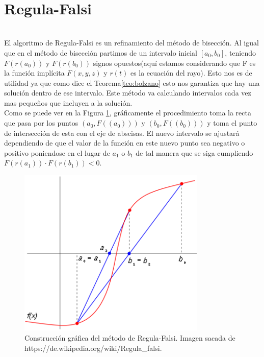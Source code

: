 ${ }$\\
\section{Regula-Falsi}
${ }$\\

El algoritmo de Regula-Falsi es un refinamiento del método de bisección. Al igual que en el método de bisección partimos de un intervalo inicial $[a_0, b_0]$, teniendo $F(r(a_0))$ y $F(r(b_0))$ signos opuestos(aquí estamos considerando que F es la función implícita $F(x,y,z)$ y $r(t)$ es la ecuación del rayo). Esto nos es de utilidad ya que como dice el Teorema\ref{teo:bolzano} esto nos garantiza que hay una solución dentro de ese intervalo. Este método va calculando intervalos cada vez mas pequeños que incluyen a la solución.
${ }$\\

Como se puede ver en la Figura \ref{fig:etiq_8}, gráficamente el procedimiento toma la recta que pasa por los puntos $(a_0, F((a_0)))$ y $(b_0, F((b_0)))$ y toma el punto de intersección de esta con el eje de abscisas. El nuevo intervalo se ajustará dependiendo de que el valor de la función en este nuevo punto sea negativo o positivo poniendose en el lugar de $a_1$ o $b_1$ de tal manera que se siga cumpliendo $F(r(a_1)) \cdot F(r(b_1)) < 0$.
${ }$\\

\begin{figure}[h]
	\begin{center}
		\includegraphics[width=0.8\textwidth]{imagenes/regulaF.png}
	\end{center}
	\caption{Construcción gráfica del método de Regula-Falsi. Imagen sacada de https://de.wikipedia.org/wiki/Regula\_falsi.}
	\label{fig:etiq_8}
\end{figure}
${ }$\\


